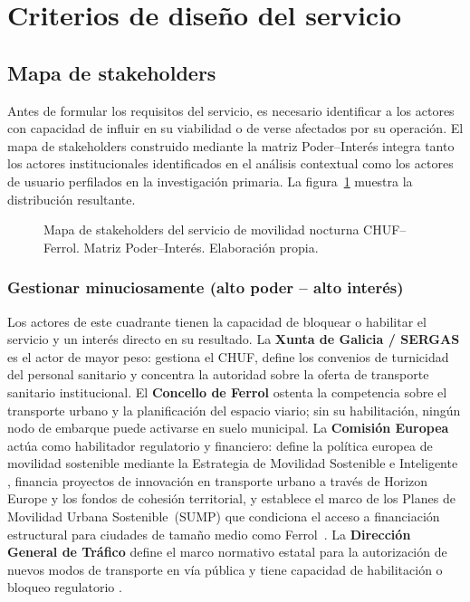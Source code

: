 \section{Criterios de diseño del servicio}\label{sec:estrategias}\label{cap:criterios}


\subsection{Mapa de stakeholders}
\label{sec:stakeholders}

Antes de formular los requisitos del servicio, es necesario identificar
a los actores con capacidad de influir en su viabilidad o de verse
afectados por su operación. El mapa de stakeholders construido mediante
la matriz Poder--Interés \parencite{Mendelow1991} integra tanto los
actores institucionales identificados en el análisis contextual como los
actores de usuario perfilados en la investigación primaria.
La figura~\ref{fig:stakeholder-map} muestra la distribución resultante.

\begin{figure}[htbp]
  \centering
  \fbox{\rule{0pt}{8cm}\rule{0.95\textwidth}{0pt}}
  \caption{Mapa de stakeholders del servicio de movilidad nocturna
    CHUF--Ferrol. Matriz Poder--Interés. Elaboración propia.}
  \label{fig:stakeholder-map}
\end{figure}

\subsubsection{Gestionar minuciosamente (alto poder -- alto interés)}

Los actores de este cuadrante tienen la capacidad de bloquear o
habilitar el servicio y un interés directo en su resultado. La
\textbf{Xunta de Galicia / SERGAS} es el actor de mayor peso: gestiona
el CHUF, define los convenios de turnicidad del personal sanitario
\parencite{XuntaGalicia2025dog} y concentra la autoridad sobre la oferta
de transporte sanitario institucional. El \textbf{Concello de Ferrol}
ostenta la competencia sobre el transporte urbano y la planificación del
espacio viario; sin su habilitación, ningún nodo de embarque puede
activarse en suelo municipal. La \textbf{Comisión Europea} actúa como
habilitador regulatorio y financiero: define la política europea de
movilidad sostenible mediante la Estrategia de Movilidad Sostenible e
Inteligente \parencite{CE_Movilidad2020}, financia proyectos de
innovación en transporte urbano a través de Horizon Europe y los fondos
de cohesión territorial, y establece el marco de los Planes de Movilidad
Urbana Sostenible~(SUMP) que condiciona el acceso a financiación
estructural para ciudades de tamaño medio como
Ferrol~\parencite{URBACTNight2024}. La \textbf{Dirección General de
Tráfico} define el marco normativo estatal para la autorización de nuevos
modos de transporte en vía pública y tiene capacidad de habilitación o
bloqueo regulatorio \parencite{DGTESAV2026}.

